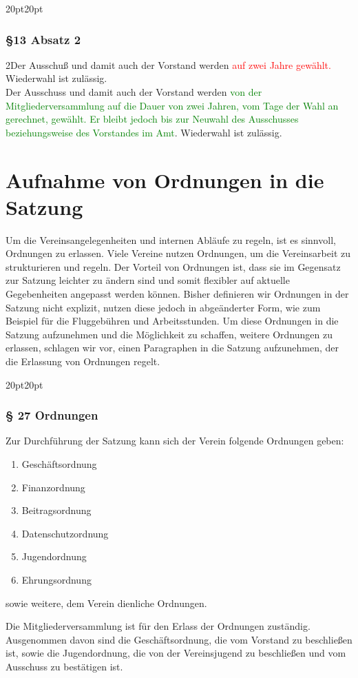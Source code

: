 \documentclass[10pt,a4paper,parskip=half]{scrartcl}
\newcommand{\new}[1]{\textcolor{Green}{#1}}
\newcommand{\old}[1]{\textcolor{Red}{#1}}
\newcommand{\change}[1]{
  \begin{adjustwidth}{20pt}{20pt}
    #1
  \end{adjustwidth}
}
\newcommand{\compare}[3]{\change{\subsubsection*{#1}\begin{multicols}{2}#2\columnbreak\\#3\end{multicols}}}
\begin{document}
  \compare{§13 Absatz 2}
  {Der Ausschuß und damit auch der Vorstand werden \old{auf zwei Jahre gewählt.}
  Wiederwahl ist zulässig.}
  {Der Ausschuss und damit auch der Vorstand werden \new{von der Mitgliederversammlung auf die Dauer von zwei Jahren, vom Tage der Wahl an gerechnet, gewählt.
  Er bleibt jedoch bis zur Neuwahl des Ausschusses beziehungsweise des Vorstandes im Amt}.  Wiederwahl ist zulässig.}

\clearpage
  \section{Aufnahme von Ordnungen in die Satzung}
  \label{sec:ordnungen}
  Um die Vereinsangelegenheiten und internen Abläufe zu regeln, ist es sinnvoll, Ordnungen zu erlassen. Viele Vereine nutzen Ordnungen, um die Vereinsarbeit zu strukturieren und regeln. Der Vorteil von Ordnungen ist, dass sie im Gegensatz zur Satzung leichter zu ändern sind und somit flexibler auf aktuelle Gegebenheiten angepasst werden können. Bisher definieren wir Ordnungen in der Satzung nicht explizit, nutzen diese jedoch in abgeänderter Form, wie zum Beispiel für die Fluggebühren und Arbeitsstunden. Um diese Ordnungen in die Satzung aufzunehmen und die Möglichkeit zu schaffen, weitere Ordnungen zu erlassen, schlagen wir vor, einen Paragraphen in die Satzung aufzunehmen, der die Erlassung von Ordnungen regelt.

  \change{
    \subsubsection*{§ 27 Ordnungen}
    Zur Durchführung der Satzung kann sich der Verein folgende Ordnungen geben:
    \begin{enumerate}[label=\alph*),noitemsep]
      \item Geschäftsordnung
      \item Finanzordnung
      \item Beitragsordnung
      \item Datenschutzordnung
      \item Jugendordnung
      \item Ehrungsordnung
    \end{enumerate}
    sowie weitere, dem Verein dienliche Ordnungen.
    \todo[inline]{Straf- oder Disziplinarordnung}
    
    Die Mitgliederversammlung ist für den Erlass der Ordnungen zuständig.
    Ausgenommen davon sind die Geschäftsordnung,
    die vom Vorstand zu beschließen ist,
    sowie die Jugendordnung,
    die von der Vereinsjugend zu beschließen und vom Ausschuss zu bestätigen ist.
    
  }
\end{document}
